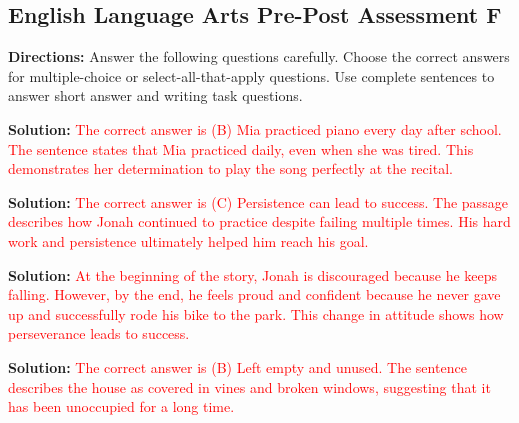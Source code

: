\documentclass[12pt]{article}
\begin{document}
\subsection*{English Language Arts Pre-Post Assessment F}
\onehalfspacing

\begin{tcolorbox}[colframe=black!50, colback=white, title=Assessment Directions]
\textbf{Directions:} Answer the following questions carefully. Choose the correct answers for multiple-choice or select-all-that-apply questions. Use complete sentences to answer short answer and writing task questions.
\end{tcolorbox}

\begin{tcolorbox}[colframe=black!50, colback=white, title=Question 1]
\textbf{Solution:} \textcolor{red}{The correct answer is (B) Mia practiced piano every day after school. The sentence states that Mia practiced daily, even when she was tired. This demonstrates her determination to play the song perfectly at the recital.}
\end{tcolorbox}

\begin{tcolorbox}[colframe=black!50, colback=white, title=Question 2]
\textbf{Solution:} \textcolor{red}{The correct answer is (C) Persistence can lead to success. The passage describes how Jonah continued to practice despite failing multiple times. His hard work and persistence ultimately helped him reach his goal.}
\end{tcolorbox}

\begin{tcolorbox}[colframe=black!50, colback=white, title=Question 3]
\textbf{Solution:} \textcolor{red}{At the beginning of the story, Jonah is discouraged because he keeps falling. However, by the end, he feels proud and confident because he never gave up and successfully rode his bike to the park. This change in attitude shows how perseverance leads to success.}
\end{tcolorbox}

\begin{tcolorbox}[colframe=black!50, colback=white, title=Question 4]
\textbf{Solution:} \textcolor{red}{The correct answer is (B) Left empty and unused. The sentence describes the house as covered in vines and broken windows, suggesting that it has been unoccupied for a long time.}
\end{tcolorbox}
\end{document}

